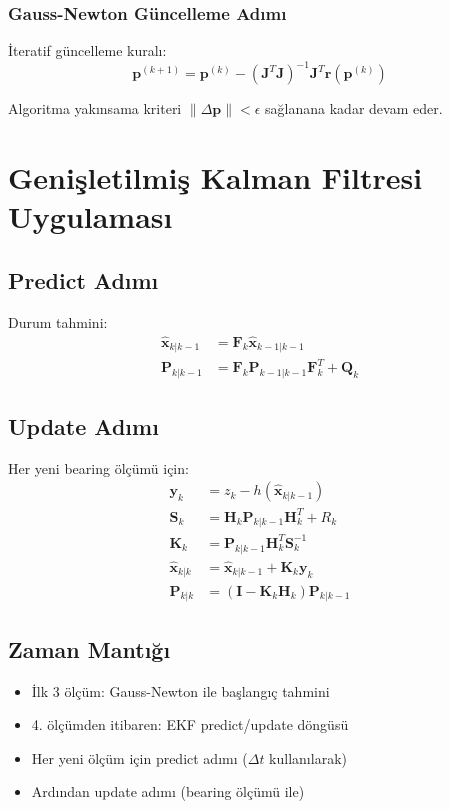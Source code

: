 \documentclass[12pt,a4paper]{article}
\begin{document}
\subsubsection{Gauss-Newton Güncelleme Adımı}
İteratif güncelleme kuralı:
\begin{equation}
\mathbf{p}^{(k+1)} = \mathbf{p}^{(k)} - \left(\mathbf{J}^T\mathbf{J}\right)^{-1} \mathbf{J}^T \mathbf{r}(\mathbf{p}^{(k)})
\end{equation}

Algoritma yakınsama kriteri $\|\Delta \mathbf{p}\| < \epsilon$ sağlanana kadar devam eder.

\section{Genişletilmiş Kalman Filtresi Uygulaması}

\subsection{Predict Adımı}
Durum tahmini:
\begin{align}
\hat{\mathbf{x}}_{k|k-1} &= \mathbf{F}_k \hat{\mathbf{x}}_{k-1|k-1} \\
\mathbf{P}_{k|k-1} &= \mathbf{F}_k \mathbf{P}_{k-1|k-1} \mathbf{F}_k^T + \mathbf{Q}_k
\end{align}

\subsection{Update Adımı}
Her yeni bearing ölçümü için:
\begin{align}
\mathbf{y}_k &= z_k - h(\hat{\mathbf{x}}_{k|k-1}) \\
\mathbf{S}_k &= \mathbf{H}_k \mathbf{P}_{k|k-1} \mathbf{H}_k^T + R_k \\
\mathbf{K}_k &= \mathbf{P}_{k|k-1} \mathbf{H}_k^T \mathbf{S}_k^{-1} \\
\hat{\mathbf{x}}_{k|k} &= \hat{\mathbf{x}}_{k|k-1} + \mathbf{K}_k \mathbf{y}_k \\
\mathbf{P}_{k|k} &= (\mathbf{I} - \mathbf{K}_k \mathbf{H}_k) \mathbf{P}_{k|k-1}
\end{align}

\subsection{Zaman Mantığı}
\begin{itemize}
    \item İlk 3 ölçüm: Gauss-Newton ile başlangıç tahmini
    \item 4. ölçümden itibaren: EKF predict/update döngüsü
    \item Her yeni ölçüm için predict adımı ($\Delta t$ kullanılarak)
    \item Ardından update adımı (bearing ölçümü ile)
\end{itemize}
\end{document}
